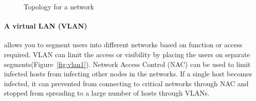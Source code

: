 \documentclass[7x9]{times}
\begin{document}



\begin{figure}[ht]
    \centering
    \hfil
    \hfil
    \caption{Topology for a network}
    \label{fig:topology}
\end{figure}

\paragraph{A virtual LAN (VLAN)} allows you to segment users
into different networks based on function or access
required. VLAN can limit the access or visibility by placing
the users on separate segments(Figure~\ref{fig:vlan1}). 
Network Access Control (NAC)
can be used to limit infected hosts from infecting other
nodes in the networks. If a single host becomes infected, it
can prevented from connecting to critical networks through
NAC and stopped from spreading to a large number of hosts
through VLANs. 
\end{document}
